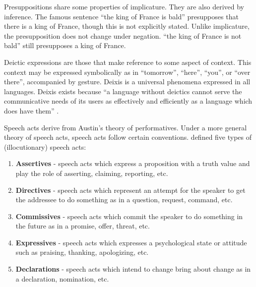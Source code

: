 Presuppositions share some properties of implicature. They are also derived by inference. The famous sentence ``the king of France is bald'' presupposes that there is a king of France, though this is not explicitly stated. Unlike implicature, the presupposition does not change under negation. ``the king of France is not bald'' still presupposes a king of France. 

Deictic expressions are those that make reference to some aspect of context. This context may be expressed symbolically as in ``tomorrow'', ``here'', ``you'', or ``over there'', accompanied by gesture. Deixis is a universal phenomena expressed in all languages. Deixis exists because ``a language without deictics cannot serve the communicative needs of its users as effectively and efficiently as a language which does have them''  \cite[p. 132]{Huang:2007ww}. 

Speech acts derive from Austin's theory of performatives. Under a more general theory of speech acts, speech acts follow certain conventions.  \cite{Searle:1969vw}  defined five types of (illocutionary) speech acts:

\begin{enumerate}
\item \textbf{Assertives} - speech acts which express a proposition with a truth value and play the role of asserting, claiming, reporting, etc.
\item \textbf{Directives} - speech acts which represent an attempt for the speaker to get the addressee to do something as in a question, request, command, etc.
\item \textbf{Commissives} - speech acts which commit the speaker to do something in the future as in a promise, offer, threat, etc.
\item \textbf{Expressives} - speech acts which expresses a psychological state or attitude such as praising, thanking, apologizing, etc.
\item \textbf{Declarations} - speech acts which intend to change bring about change as in a declaration, nomination, etc.
\end{enumerate} 

